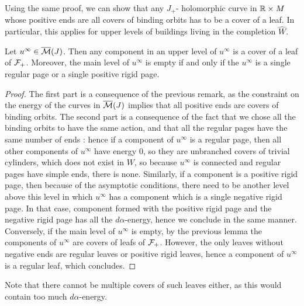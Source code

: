 \documentclass[../main.tex]{subfiles}
\begin{document}
\begin{remark}
Using the same proof, we can show that any $J_+$- holomorphic curve in $\mathbb{R}\times M$ whose positive ends are all covers of binding orbits has to be a cover of a leaf. In particular, this applies for upper levels of buildings living in the completion $\widehat{W}$.
\end{remark}



\begin{lemma}
Let $u^\infty\in \overline{\mathcal{M}}(J)$. Then any component in an upper level of $u^\infty$ is a cover of a leaf of $\mathcal{F}_+$. Moreover, the main level of $u^{\infty}$ is empty if and only if the $u^\infty$ is a single regular page or a single positive rigid page. 

\end{lemma}

\begin{proof}
The first part is a consequence of the previous remark, as the constraint on the energy of the curves in $\overline{\mathcal{M}}(J)$ implies that all positive ends are covers of binding orbits. The second part is a consequence of the fact that we chose all the binding orbits to have the same action, and that all the regular pages have the same number of ends : hence if a component of $u^\infty$ is a regular page, then all other components of $u^\infty$ have energy $0$, so they are unbranched covers of trivial cylinders, which does not exist in $W$, so because $u^\infty$ is connected and regular pages have simple ends, there is none. Similarly, if a component is a positive rigid page, then because of the asymptotic conditions, there need to be another level above this level in which $u^\infty$ has a component which is a single negative rigid page. In that case, component formed with the positive rigid page and the negative rigid page has all the $d\alpha$-energy, hence we conclude in the same manner.\\
Conversely, if the main level of $u^\infty$ is empty, by the previous lemma the components of $u^\infty$ are covers of leafs of $\mathcal{F}_+$. However, the only leaves without negative ends are regular leaves or positive rigid leaves, hence a component of $u^\infty$ is a regular leaf, which concludes. 
\end{proof}

\begin{remark}
    Note that there cannot be multiple covers of such leaves either, as this would contain too much $d\alpha$-energy.
\end{remark}
\end{document}
